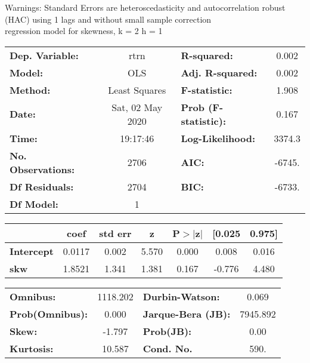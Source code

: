 Warnings: \newline
 [1] Standard Errors are heteroscedasticity and autocorrelation robust (HAC) using 1 lags and without small sample correction\\ 

regression model for skewness, k = 2 h = 1\begin{center}
\begin{tabular}{lclc}
\toprule
\textbf{Dep. Variable:}    &       rtrn       & \textbf{  R-squared:         } &     0.002   \\
\textbf{Model:}            &       OLS        & \textbf{  Adj. R-squared:    } &     0.002   \\
\textbf{Method:}           &  Least Squares   & \textbf{  F-statistic:       } &     1.908   \\
\textbf{Date:}             & Sat, 02 May 2020 & \textbf{  Prob (F-statistic):} &    0.167    \\
\textbf{Time:}             &     19:17:46     & \textbf{  Log-Likelihood:    } &    3374.3   \\
\textbf{No. Observations:} &        2706      & \textbf{  AIC:               } &    -6745.   \\
\textbf{Df Residuals:}     &        2704      & \textbf{  BIC:               } &    -6733.   \\
\textbf{Df Model:}         &           1      & \textbf{                     } &             \\
\bottomrule
\end{tabular}
\begin{tabular}{lcccccc}
                   & \textbf{coef} & \textbf{std err} & \textbf{z} & \textbf{P$> |$z$|$} & \textbf{[0.025} & \textbf{0.975]}  \\
\midrule
\textbf{Intercept} &       0.0117  &        0.002     &     5.570  &         0.000        &        0.008    &        0.016     \\
\textbf{skw}       &       1.8521  &        1.341     &     1.381  &         0.167        &       -0.776    &        4.480     \\
\bottomrule
\end{tabular}
\begin{tabular}{lclc}
\textbf{Omnibus:}       & 1118.202 & \textbf{  Durbin-Watson:     } &    0.069  \\
\textbf{Prob(Omnibus):} &   0.000  & \textbf{  Jarque-Bera (JB):  } & 7945.892  \\
\textbf{Skew:}          &  -1.797  & \textbf{  Prob(JB):          } &     0.00  \\
\textbf{Kurtosis:}      &  10.587  & \textbf{  Cond. No.          } &     590.  \\
\bottomrule
\end{tabular}
\end{center}


